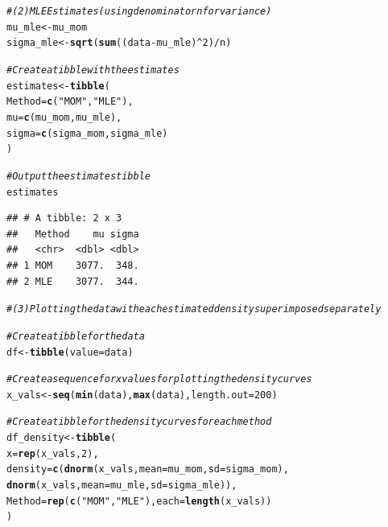 \documentclass{article}\usepackage[]{graphicx}\usepackage[]{xcolor}
\makeatletter
\newcommand{\hlnum}[1]{\textcolor[rgb]{0.686,0.059,0.569}{#1}}%
\newcommand{\hlsng}[1]{\textcolor[rgb]{0.192,0.494,0.8}{#1}}%
\newcommand{\hlcom}[1]{\textcolor[rgb]{0.678,0.584,0.686}{\textit{#1}}}%
\newcommand{\hlopt}[1]{\textcolor[rgb]{0,0,0}{#1}}%
\newcommand{\hldef}[1]{\textcolor[rgb]{0.345,0.345,0.345}{#1}}%
\newcommand{\hlkwb}[1]{\textcolor[rgb]{0.69,0.353,0.396}{#1}}%
\newcommand{\hlkwc}[1]{\textcolor[rgb]{0.333,0.667,0.333}{#1}}%
\newcommand{\hlkwd}[1]{\textcolor[rgb]{0.737,0.353,0.396}{\textbf{#1}}}%
\newenvironment{kframe}{%
 \def\at@end@of@kframe{}%
 \ifinner\ifhmode%
  \def\at@end@of@kframe{\end{minipage}}%
  \begin{minipage}{\columnwidth}%
 \fi\fi%
 \def\FrameCommand##1{\hskip\@totalleftmargin \hskip-\fboxsep
 \colorbox{shadecolor}{##1}\hskip-\fboxsep
     \hskip-\linewidth \hskip-\@totalleftmargin \hskip\columnwidth}%
 \MakeFramed {\advance\hsize-\width
   \@totalleftmargin\z@ \linewidth\hsize
   \@setminipage}}%
 {\par\unskip\endMakeFramed%
 \at@end@of@kframe}
\newenvironment{knitrout}{}{} %
\makeatother
\begin{document}
\begin{knitrout}
\begin{kframe}
\begin{alltt}
\hlcom{# (2) MLE Estimates (using denominator n for variance)}
\hldef{mu_mle} \hlkwb{<-} \hldef{mu_mom}
\hldef{sigma_mle} \hlkwb{<-} \hlkwd{sqrt}\hldef{(}\hlkwd{sum}\hldef{((data} \hlopt{-} \hldef{mu_mle)}\hlopt{^}\hlnum{2}\hldef{)} \hlopt{/} \hldef{n)}

\hlcom{# Create a tibble with the estimates}
\hldef{estimates} \hlkwb{<-} \hlkwd{tibble}\hldef{(}
  \hlkwc{Method} \hldef{=} \hlkwd{c}\hldef{(}\hlsng{"MOM"}\hldef{,} \hlsng{"MLE"}\hldef{),}
  \hlkwc{mu} \hldef{=} \hlkwd{c}\hldef{(mu_mom, mu_mle),}
  \hlkwc{sigma} \hldef{=} \hlkwd{c}\hldef{(sigma_mom, sigma_mle)}
\hldef{)}

\hlcom{# Output the estimates tibble}
\hldef{estimates}
\end{alltt}
\begin{verbatim}
## # A tibble: 2 x 3
##   Method    mu sigma
##   <chr>  <dbl> <dbl>
## 1 MOM    3077.  348.
## 2 MLE    3077.  344.
\end{verbatim}
\begin{alltt}
\hlcom{# (3) Plotting the data with each estimated density superimposed separately}

\hlcom{# Create a tibble for the data}
\hldef{df} \hlkwb{<-} \hlkwd{tibble}\hldef{(}\hlkwc{value} \hldef{= data)}

\hlcom{# Create a sequence for x values for plotting the density curves}
\hldef{x_vals} \hlkwb{<-} \hlkwd{seq}\hldef{(}\hlkwd{min}\hldef{(data),} \hlkwd{max}\hldef{(data),} \hlkwc{length.out} \hldef{=} \hlnum{200}\hldef{)}

\hlcom{# Create a tibble for the density curves for each method}
\hldef{df_density} \hlkwb{<-} \hlkwd{tibble}\hldef{(}
  \hlkwc{x} \hldef{=} \hlkwd{rep}\hldef{(x_vals,} \hlnum{2}\hldef{),}
  \hlkwc{density} \hldef{=} \hlkwd{c}\hldef{(}\hlkwd{dnorm}\hldef{(x_vals,} \hlkwc{mean} \hldef{= mu_mom,} \hlkwc{sd} \hldef{= sigma_mom),}
              \hlkwd{dnorm}\hldef{(x_vals,} \hlkwc{mean} \hldef{= mu_mle,} \hlkwc{sd} \hldef{= sigma_mle)),}
  \hlkwc{Method} \hldef{=} \hlkwd{rep}\hldef{(}\hlkwd{c}\hldef{(}\hlsng{"MOM"}\hldef{,} \hlsng{"MLE"}\hldef{),} \hlkwc{each} \hldef{=} \hlkwd{length}\hldef{(x_vals))}
\hldef{)}


\end{alltt}
\end{kframe}
\end{knitrout}
\end{document}

